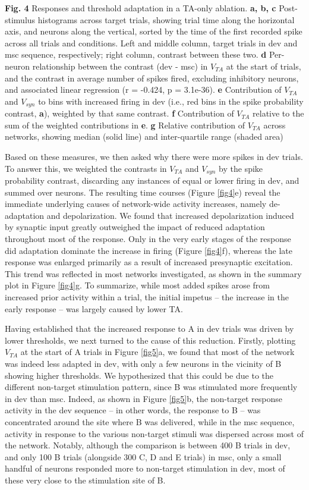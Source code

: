 \documentclass[pdflatex,referee,iicol,sn-basic]{sn-jnl}
\theoremstyle{thmstyleone}%
\theoremstyle{thmstyletwo}%
\theoremstyle{thmstylethree}%
\begin{document}
\textbf{Fig. 4} Responses and threshold adaptation in a TA-only ablation. \textbf{a, b, c} Post-stimulus histograms across target trials, showing trial time along the horizontal axis, and neurons along the vertical, sorted by the time of the first recorded spike across all trials and conditions. Left and middle column, target trials in dev and msc sequence, respectively; right column, contrast between these two. \textbf{d} Per-neuron relationship between the contrast (dev - msc) in $V_{TA}$ at the start of trials, and the contrast in average number of spikes fired, excluding inhibitory neurons, and associated linear regression (r = -0.424, p = 3.1e-36). \textbf{e} Contribution of $V_{TA}$ and $V_{syn}$ to bins with increased firing in dev (i.e., red bins in the spike probability contrast, \textbf{a}), weighted by that same contrast. \textbf{f} Contribution of $V_{TA}$ relative to the sum of the weighted contributions in \textbf{e}. \textbf{g} Relative contribution of $V_{TA}$ across networks, showing median (solid line) and inter-quartile range (shaded area)

Based on these measures, we then asked why there were more spikes in dev trials. To answer this, we weighted the contrasts in $V_{TA}$ and $V_{syn}$ by the spike probability contrast, discarding any instances of equal or lower firing in dev, and summed over neurons. The resulting time courses (Figure \ref{fig4}e) reveal the immediate underlying causes of network-wide activity increases, namely de-adaptation and depolarization. We found that increased depolarization induced by synaptic input greatly outweighed the impact of reduced adaptation throughout most of the response. Only in the very early stages of the response did adaptation dominate the increase in firing (Figure \ref{fig4}f), whereas the late response was enlarged primarily as a result of increased presynaptic excitation. This trend was reflected in most networks investigated, as shown in the summary plot in Figure \ref{fig4}g. To summarize, while most added spikes arose from increased prior activity within a trial, the initial impetus -- the increase in the early response -- was largely caused by lower TA.

Having established that the increased response to A in dev trials was driven by lower thresholds, we next turned to the cause of this reduction. Firstly, plotting $V_{TA}$ at the start of A trials in Figure \ref{fig5}a, we found that most of the network was indeed less adapted in dev, with only a few neurons in the vicinity of B showing higher thresholds. We hypothesized that this could be due to the different non-target stimulation pattern, since B was stimulated more frequently in dev than msc. Indeed, as shown in Figure \ref{fig5}b, the non-target response activity in the dev sequence -- in other words, the response to B -- was concentrated around the site where B was delivered, while in the msc sequence, activity in response to the various non-target stimuli was dispersed across most of the network. Notably, although the comparison is between 400 B trials in dev, and only 100 B trials (alongside 300 C, D and E trials) in msc, only a small handful of neurons responded more to non-target stimulation in dev, most of these very close to the stimulation site of B.
\end{document}
